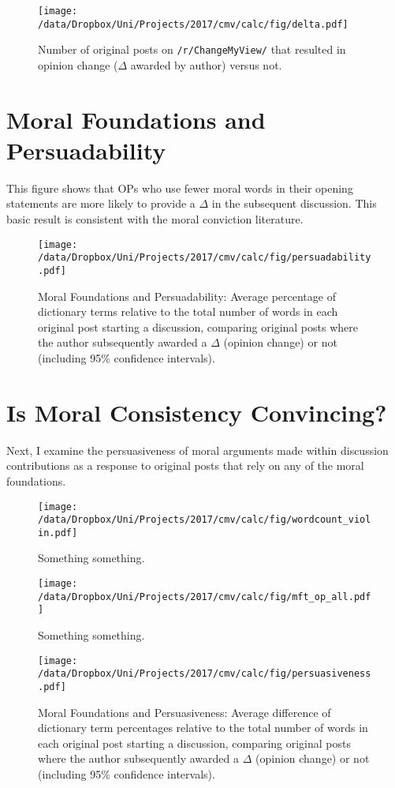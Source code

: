 \begin{figure}
\centering
\texttt{[image: /data/Dropbox/Uni/Projects/2017/cmv/calc/fig/delta.pdf]}
\caption{Number of original posts on \texttt{/r/ChangeMyView/} that resulted in opinion change ($\Delta$ awarded by author) versus not.}
\end{figure}


\section{Moral Foundations and Persuadability}\label{moral-foundations-and-persuadability}

This figure shows that OPs who use fewer moral words in their opening statements are more likely to provide a \(\Delta\) in the subsequent discussion. This basic result is consistent with the moral conviction literature.

\begin{figure}
\centering
\texttt{[image: /data/Dropbox/Uni/Projects/2017/cmv/calc/fig/persuadability.pdf]}
\caption[Moral Foundations and Persuadability]{Moral Foundations and Persuadability: Average percentage of dictionary terms relative to the total number of words in each original post starting a discussion, comparing original posts where the author subsequently awarded a $\Delta$ (opinion change) or not (including 95\% confidence intervals).}
\end{figure}

\section{Is Moral Consistency
Convincing?}\label{is-moral-consistency-convincing}

Next, I examine the persuasiveness of moral arguments made within discussion contributions as a response to original posts that rely on any of the moral foundations.

\begin{figure}
\centering
\texttt{[image: /data/Dropbox/Uni/Projects/2017/cmv/calc/fig/wordcount\_violin.pdf]}
\caption{Something something.}
\end{figure}

\begin{figure}
\centering
\texttt{[image: /data/Dropbox/Uni/Projects/2017/cmv/calc/fig/mft\_op\_all.pdf]}
\caption{Something something.}
\end{figure}



\begin{figure}
\centering
\texttt{[image: /data/Dropbox/Uni/Projects/2017/cmv/calc/fig/persuasiveness.pdf]}
\caption[Moral Foundations and Persuasiveness]{Moral Foundations and Persuasiveness: Average difference of dictionary term percentages relative to the total number of words in each original post starting a discussion, comparing original posts where the author subsequently awarded a $\Delta$ (opinion change) or not (including 95\% confidence intervals).}
\end{figure}



